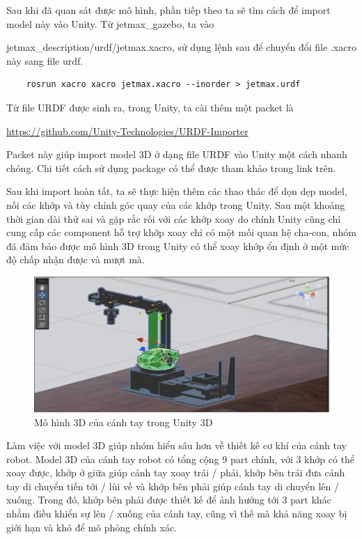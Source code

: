 Sau khi đã quan sát được mô hình, phần tiếp theo ta sẽ tìm cách để import model này vào Unity. Từ jetmax\_gazebo, ta vào 

jetmax\_description/urdf/jetmax.xacro, sử dụng lệnh sau để chuyển đổi file .xacro này sang file urdf.

\begin{lstlisting}
    rosrun xacro xacro jetmax.xacro --inorder > jetmax.urdf
\end{lstlisting}

Từ file URDF được sinh ra, trong Unity, ta cài thêm một packet là 

\href{https://github.com/Unity-Technologies/URDF-Importer}{https://github.com/Unity-Technologies/URDF-Importer} 

Packet này giúp import model 3D ở dạng file URDF vào Unity một cách nhanh chóng. Chi tiết cách sử dụng package có thể được tham khảo trong link trên.

Sau khi import hoàn tất, ta sẽ thực hiện thêm các thao thác để dọn dẹp model, nối các khớp và tùy chỉnh góc quay của các khớp trong Unity. Sau một khoảng thời gian dài thử sai và gặp rắc rối với các khớp xoay do chính Unity cũng chỉ cung cấp các component hỗ trợ khớp xoay chỉ có một mối quan hệ cha-con, nhóm đã đảm bảo được mô hình 3D trong Unity có thể xoay khớp ổn định ở một mức độ chấp nhận được và mượt mà.

\begin{figure}[H]
    \centering
    \includegraphics[width=1\textwidth]{Images/Implementation/VRapp/model3d_3.jpg}
    \caption{Mô hình 3D của cánh tay trong Unity 3D}
    \label{fig:model3d_3}
\end{figure}

Làm việc với model 3D giúp nhóm hiểu sâu hơn về thiết kế cơ khí của cánh tay robot. Model 3D của cánh tay robot có tổng cộng 9 part chính, với 3 khớp có thể xoay được, khớp ở giữa giúp cánh tay xoay trái / phải, khớp bên trái đưa cánh tay di chuyển tiến tới / lùi về và khớp bên phải giúp cánh tay di chuyển lên / xuống. Trong đó, khớp bên phải được thiết kế để ảnh hưởng tới 3 part khác nhằm điều khiển sự lên / xuống của cánh tay, cũng vì thế mà khả năng xoay bị giới hạn và khó để mô phỏng chính xác.

